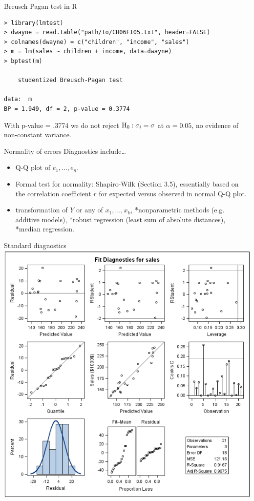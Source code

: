 \documentclass{beamer}
\begin{document}
\begin{frame}[fragile]{Breusch Pagan test in {\sc R}}
\begin{footnotesize}
\begin{verbatim}
> library(lmtest)
> dwayne = read.table("path/to/CH06FI05.txt", header=FALSE)
> colnames(dwayne) = c("children", "income", "sales")
> m = lm(sales ~ children + income, data=dwayne)
> bptest(m)

	studentized Breusch-Pagan test

data:  m
BP = 1.949, df = 2, p-value = 0.3774
\end{verbatim}
\end{footnotesize}
\pause With p-value = .3774 we do not reject ${\rm H}_0: \sigma_i=\sigma$ at $\alpha=0.05$, no evidence of non-constant variance.
\end{frame}

\begin{frame}{Normality of errors}
Diagnostics include\ldots
\begin{itemize}
\item Q-Q plot of $e_1,\ldots,e_n$.
\item<2-> Formal test for normality: Shapiro-Wilk (Section 3.5),
essentially based on the correlation coefficient $r$ for expected
versus observed in normal Q-Q plot.
\item<3->  transformation of $Y$ or any of $x_1, \ldots, x_k$,
*nonparametric methods (e.g. additive models), *robust
regression (least sum of absolute distances), *median
regression.
\end{itemize}
\end{frame}

\begin{frame}{Standard diagnostics}
\centering\includegraphics[scale=0.27]{plots/sales-diag}
\end{frame}
\end{document}
